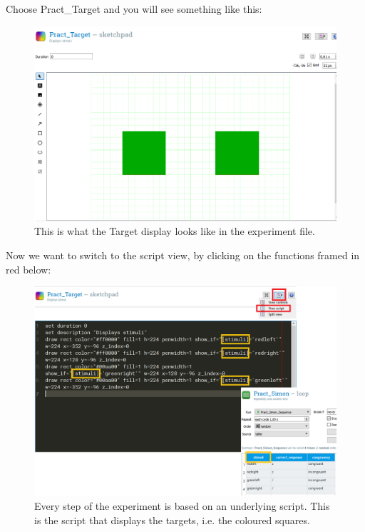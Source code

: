 \documentclass[
]{book}
\begin{document}
Choose Pract\_Target and you will see something like this:

\begin{figure}

{\centering \includegraphics[width=0.99\linewidth]{images/changesimon/01Pract_Target} 

}

\caption{This is what the Target display looks like in the experiment file.}\label{fig:Figure3-5}
\end{figure}

Now we want to switch to the script view, by clicking on the functions framed in red below:

\begin{figure}

{\centering \includegraphics[width=0.99\linewidth]{images/changesimon/02Script} 

}

\caption{Every step of the experiment is based on an underlying script. This is the script that displays the targets, i.e. the coloured squares.}\label{fig:Figure3-6}
\end{figure}
\end{document}
